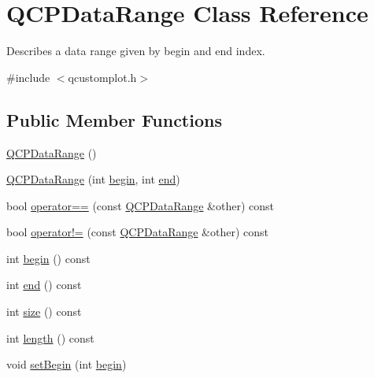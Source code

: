\hypertarget{class_q_c_p_data_range}{}\section{Q\+C\+P\+Data\+Range Class Reference}
\label{class_q_c_p_data_range}


Describes a data range given by begin and end index.  




{\ttfamily \#include $<$qcustomplot.\+h$>$}

\subsection*{Public Member Functions}
\begin{DoxyCompactItemize}
\item 
\mbox{\hyperlink{class_q_c_p_data_range_a49e72fd9bace1da9d875136dcc04c986}{Q\+C\+P\+Data\+Range}} ()
\item 
\mbox{\hyperlink{class_q_c_p_data_range_a6c7f4a3684210423270515403060e9cf}{Q\+C\+P\+Data\+Range}} (int \mbox{\hyperlink{class_q_c_p_data_range_ae76d7eba9defdfafcd0fc41096793129}{begin}}, int \mbox{\hyperlink{class_q_c_p_data_range_aee1b20fb045929c3753ee2ce14af7630}{end}})
\item 
bool \mbox{\hyperlink{class_q_c_p_data_range_a8bfd79a282f6ebd766d60caa683242d3}{operator==}} (const \mbox{\hyperlink{class_q_c_p_data_range}{Q\+C\+P\+Data\+Range}} \&other) const
\item 
bool \mbox{\hyperlink{class_q_c_p_data_range_a5bcc9597731a7455407853ed0585f6ab}{operator!=}} (const \mbox{\hyperlink{class_q_c_p_data_range}{Q\+C\+P\+Data\+Range}} \&other) const
\item 
int \mbox{\hyperlink{class_q_c_p_data_range_ae76d7eba9defdfafcd0fc41096793129}{begin}} () const
\item 
int \mbox{\hyperlink{class_q_c_p_data_range_aee1b20fb045929c3753ee2ce14af7630}{end}} () const
\item 
int \mbox{\hyperlink{class_q_c_p_data_range_ac6af055e509d1b691c244954ff1c5887}{size}} () const
\item 
int \mbox{\hyperlink{class_q_c_p_data_range_a1e7836058f755c6ab9f11996477b7150}{length}} () const
\item 
void \mbox{\hyperlink{class_q_c_p_data_range_a54ff59048e01e46ac4aefafc844626c6}{set\+Begin}} (int \mbox{\hyperlink{class_q_c_p_data_range_ae76d7eba9defdfafcd0fc41096793129}{begin}})
\item 

\end{DoxyCompactItemize}

